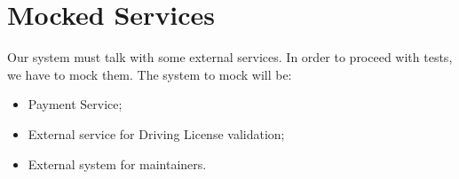 \section{Mocked Services}
Our system must talk with some external services. In order to proceed with tests, we have to mock them. The system to mock will be:
\begin{itemize}
\item Payment Service;
\item External service for Driving License validation;
\item External system for maintainers.
\end{itemize}